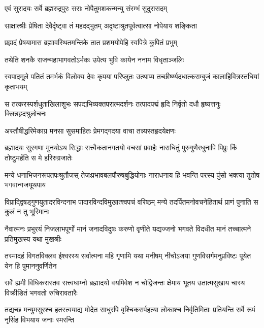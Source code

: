 

\twolineshloka
{एवं सुरादयः सर्वे ब्रह्मरुद्रपुरः सराः}
{नोपैतुमशकन्मन्यु संरम्भं सुदुरासदम्} %

\twolineshloka
{साक्षात्श्रीः प्रेषिता देवैर्दृष्ट्वा तं महदद्भुतम्}
{अदृष्टाश्रुतपूर्वत्वात्सा नोपेयाय शङ्किता} %

\twolineshloka
{प्रह्रादं प्रेषयामास ब्रह्मावस्थितमन्तिके}
{तात प्रशमयोपेहि स्वपित्रे कुपितं प्रभुम्} %

\twolineshloka
{तथेति शनकै राजन्महाभागवतोऽर्भकः}
{उपेत्य भुवि कायेन ननाम विधृताञ्जलिः} %

\fourlineindentedshloka
{स्वपादमूले पतितं तमर्भकं}
{विलोक्य देवः कृपया परिप्लुतः}
{उत्थाप्य तच्छीर्ष्ण्यदधात्कराम्बुजं}
{कालाहिवित्रस्तधियां कृताभयम्} %

\fourlineindentedshloka
{स तत्करस्पर्शधुताखिलाशुभः}
{सपद्यभिव्यक्तपरात्मदर्शनः}
{तत्पादपद्मं हृदि निर्वृतो दधौ}
{हृष्यत्तनुः क्लिन्नहृदश्रुलोचनः} %

\twolineshloka
{अस्तौषीद्धरिमेकाग्र मनसा सुसमाहितः}
{प्रेमगद्गदया वाचा तन्न्यस्तहृदयेक्षणः} %



\fourlineindentedshloka
{ब्रह्मादयः सुरगणा मुनयोऽथ सिद्धाः}
{सत्त्वैकतानगतयो वचसां प्रवाहैः}
{नाराधितुं पुरुगुणैरधुनापि पिप्रुः}
{किं तोष्टुमर्हति स मे हरिरुग्रजातेः} %

\fourlineindentedshloka
{मन्ये धनाभिजनरूपतपःश्रुतौजस्}
{तेजःप्रभावबलपौरुषबुद्धियोगाः}
{नाराधनाय हि भवन्ति परस्य पुंसो}
{भक्त्या तुतोष भगवान्गजयूथपाय} %

\fourlineindentedshloka
{विप्राद्द्विषड्गुणयुतादरविन्दनाभ}
{पादारविन्दविमुखात्श्वपचं वरिष्ठम्}
{मन्ये तदर्पितमनोवचनेहितार्थ}
{प्राणं पुनाति स कुलं न तु भूरिमानः} %

\fourlineindentedshloka
{नैवात्मनः प्रभुरयं निजलाभपूर्णो}
{मानं जनादविदुषः करुणो वृणीते}
{यद्यज्जनो भगवते विदधीत मानं}
{तच्चात्मने प्रतिमुखस्य यथा मुखश्रीः} %

\fourlineindentedshloka
{तस्मादहं विगतविक्लव ईश्वरस्य}
{सर्वात्मना महि गृणामि यथा मनीषम्}
{नीचोऽजया गुणविसर्गमनुप्रविष्टः}
{पूयेत येन हि पुमाननुवर्णितेन} %

\fourlineindentedshloka
{सर्वे ह्यमी विधिकरास्तव सत्त्वधाम्नो}
{ब्रह्मादयो वयमिवेश न चोद्विजन्तः}
{क्षेमाय भूतय उतात्मसुखाय चास्य}
{विक्रीडितं भगवतो रुचिरावतारैः} %

\fourlineindentedshloka
{तद्यच्छ मन्युमसुरश्च हतस्त्वयाद्य}
{मोदेत साधुरपि वृश्चिकसर्पहत्या}
{लोकाश्च निर्वृतिमिताः प्रतियन्ति सर्वे}
{रूपं नृसिंह विभयाय जनाः स्मरन्ति} %

